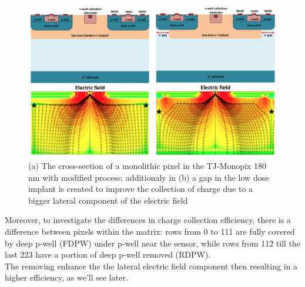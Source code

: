     \begin{figure}[h!]
        \centering
        \includegraphics[width=.9\linewidth]{figures/Monopix1/Monopix1_section_scheme.png}
        \caption{(a) The cross-section of a monolithic pixel in the TJ-Monopix 180 nm with modified process; additionaly in (b) a gap in the low dose implant is created to improve the collection of charge due to a bigger lateral component of the electric field}
        \label{fig:Monopix1_section_scheme}
    \end{figure}

    Moreover, to investigate the differences in charge collection efficiency, there is a difference between pixels within the matrix: rows from 0 to 111 are fully covered by deep p-well (FDPW) under p-well near the sensor, while rows from 112 till the last 223 have a portion of deep p-well removed (RDPW). \\
    The removing enhance the the lateral electric field component then resulting in a higher efficiency, as we'll see later.\\

